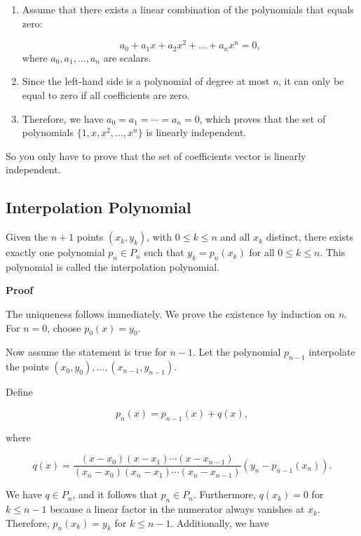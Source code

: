 \begin{enumerate}

	\item Assume that there exists a linear combination of the polynomials that equals zero:   

	\[
	    a_0 + a_1 x + a_2 x^2 + \ldots + a_n x^n = 0,
    \]
 		where \(a_0, a_1, \ldots, a_n\) are scalars.
	
	\item Since the left-hand side is a polynomial of degree at most \emph{n}, it can only be equal 
		  to zero if all coefficients are zero.
 
	\item Therefore, we have \(a_0 = a_1 = \cdots = a_n = 0\), which 
		  proves that the set of polynomials \(\{1, x, x^2, \ldots, x^n\}\) is linearly independent.

\end{enumerate}

So you only have to prove that the set of coefficients vector is linearly independent.

\subsection{Interpolation Polynomial}

Given the \(n+1\) points \((x_k, y_k)\), with \(0 \leq k \leq n\) and all \(x_k\) distinct, 
there exists exactly one polynomial \(p_n \in P_n\) such that \(y_k = p_n(x_k)\) for all 
\(0 \leq k \leq n\). This polynomial is called the interpolation polynomial.
\vspace{\baselineskip}

\textbf{Proof}

The uniqueness follows immediately. We prove the existence by induction on 
\emph{n}. For \(n = 0\), choose \(p_0(x) = y_0\). 
\vspace{\baselineskip}

Now assume the statement is true for \(n-1\). Let the polynomial \(p_{n-1}\)
interpolate the points \((x_0, y_0), \ldots, (x_{n-1}, y_{n-1})\). 
\vspace{\baselineskip}

Define

\[
	p_n(x) = p_{n-1}(x) + q(x),
\]

where

\[
	q(x) = \frac{(x - x_0)(x - x_1)\cdots(x - x_{n-1})}{(x_n - x_0)(x_n - x_1)\cdots(x_n - x_{n-1})} 
	(y_n - p_{n-1}(x_n)).
\]

We have \(q \in P_n\), and it follows that \(p_n \in P_n\). 
Furthermore, \(q(x_k) = 0\) for \(k \leq n-1\) because a linear factor in 
the numerator always vanishes at \(x_k\). Therefore, \(p_n(x_k) = y_k\) for 
\(k \leq n-1\). Additionally, we have

